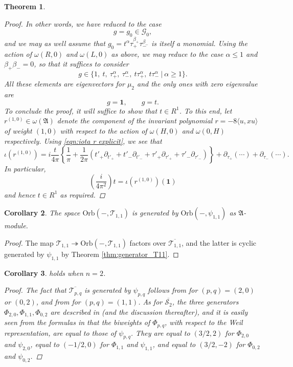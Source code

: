 \documentclass[reqno, 11pt]{amsart} %
\numberwithin{equation}{section}
\theoremstyle{plain}
\newtheorem{theorem}{Theorem}[section]
\newtheorem{corollary}[theorem]{Corollary}
\theoremstyle{definition}
\theoremstyle{remark}
\newcommand{\ov}{\overline}
\newcommand{\mcT}{\mathcal{T}}
\newcommand{\mfA}{\mathfrak{A}}
\newcommand{\calG}{\mathcal G}
\newcommand{\lie}[1]{ \mathfrak{#1}}
\newcommand{\Orb}{\mathrm{Orb}}
\begin{document}
\begin{theorem}
\begin{proof}
In other words, we have reduced to the case
$$g = g_0 \in \calG_0,$$
and we may as well assume that $g_0 = t^{\alpha} \tau_+^{\beta_+}\tau_-^{\beta_-}$ is itself a monomial. Using the action of $\omega(R,0)$ and $\omega(L,0)$ as above, we may reduce to the case $\alpha \leq 1$ and $\beta_+ \beta_- = 0$, so that it suffices to consider
\[
g \in \{  1, \  t, \ \tau_+^{\alpha}, \ \tau_-^{\alpha}, \ t \tau_+^{\alpha}, \ t \tau_-^{\alpha} \ | \ \alpha \geq 1  \}.
\]
All these elements are eigenvectors for $\mu_2$ and the only ones with zero eigenvalue are
\[
g= \mathbf 1, \qquad g = t.
\]
To conclude the proof, it will suffice to show that $t \in R^1$. To this end, let $r^{(1,0)} \in ω(\lie A)$ denote the component of the invariant polynomial $r = -8 \langle u, xu \rangle$ of weight $(1,0)$ with respect to the action of $\omega(H, 0)$ and $\omega(0, H)$ respectively.  Using \eqref{eqn:iota r explicit}, we see that
\[
\iota(r^{(1,0)}) = i \frac{t}{4\pi }   \left\{   \frac{1}{\pi} + \frac{1}{2 \pi} \left( t'_+ \partial_{t'_+} + t'_- \partial_{t'_-} + \tau'_+ \partial_{\tau'_+} + \tau'_- \partial_{\tau'_-} \right) \right\}  + \partial_{\tau_+} \left( \cdots \right) + \partial_{\tau_-}\left( \cdots \right).
\]
In particular,
\[
\left( \frac{i}{4 \pi^2}\right)t = \iota(r^{(1,0)}) (\mathbf 1)
\]
and hence $t \in R^1$ as required.
\end{proof}
\end{theorem}

\begin{corollary}\label{cor:main_T_11}
The space $\Orb(-,\mcT_{1,1})$ is generated by $\Orb(-,ψ_{1,1})$ as $\mfA$-module.
\end{corollary}
\begin{proof}
The map $\mcT_{1,1}\twoheadrightarrow \Orb(-,\mcT_{1,1})$ factors over $\ov{\mcT_{1,1}}$, and the latter is cyclic generated by $ψ_{1,1}$ by Theorem \ref{thm:generator_T11}.
\end{proof}

\begin{corollary} \label{cor:cyclic coinv n=2}
   holds when $n = 2$.
  \begin{proof}
  	The fact that $\overline{\mathcal T_{p,q}}$ is generated by $\psi_{p,q}$ follows from  for $(p,q) = (2,0) $ or $(0,2)$, and from  for $(p,q) = (1,1)$. As for $\overline{\mathcal S_2}$, the three generators $\Phi_{2,0}, \Phi_{1,1}, \Phi_{0,2}$ are described in  (and the discussion thereafter), and it is easily seen from the formulas in  that the biweights of $\Phi_{p,q}$, with respect to the Weil representation, are equal to those of $\psi_{p,q}$. They are equal to $(3/2, 2)$ for $Φ_{2,0}$ and $ψ_{2,0}$, equal to $(-1/2, 0)$ for $Φ_{1,1}$ and $ψ_{1,1}$, and equal to $(3/2, -2)$ for $Φ_{0,2}$ and $ψ_{0,2}$. 
  \end{proof}
\end{corollary}
\end{document}
